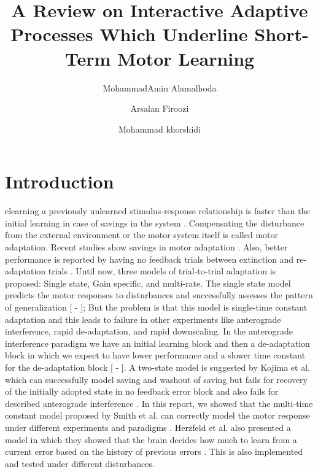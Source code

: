 \documentclass[9pt,twocolumn]{paper-template}
\title{A Review on Interactive Adaptive Processes Which Underline Short-Term Motor Learning}
\author[a]{MohammadAmin Alamalhoda}
\author[a]{Arsalan Firoozi}
\author[a]{Mohammad khorshidi}
\affil[a]{Student, EE Department, Sharif University of Technology}
\begin{document}
\maketitle
\thispagestyle{firststyle}

\section*{Introduction}
elearning a previously unlearned stimulus-response relationship is faster than the initial learning in case of savings in the system \cite{main_paper}. Compensating the disturbance from the external environment or the motor system itself is called motor adaptation. Recent studies show savings in motor adaptation \cite{Kojima}. Also, better performance is reported by having no feedback trials between extinction and re-adaptation trials \cite{Kojima}. 
Until now, three models of trial-to-trial adaptation is proposed: Single state, Gain specific, and multi-rate. The single state model predicts the motor responses to disturbances and successfully assesses the pattern of generalization [\cite{Scheidt} - \cite{Donchin}]; But the problem is that this model is single-time constant adaptation and this leads to failure in other experiments like anterograde interference, rapid de-adaptation, and rapid downscaling. In the anterograde interference paradigm we have an initial learning block and then a de-adaptation block in which we expect to have lower performance and a slower time constant for the de-adaptation block [\cite{Bizzi} - \cite{Wolpert}]. A two-state model is suggested by Kojima et al. which can successfully model saving and washout of saving but fails for recovery of the initially adopted state in no feedback error block and also fails for described anterograde interference \cite{Kojima}.
In this report, we showed that the multi-time constant model proposed by Smith et al. can correctly model the motor response under different experiments and paradigms \cite{main_paper}. Herzfeld et al. also presented a model in which they showed that the brain decides how much to learn from a current error based on the history of previous errors \cite{mem_error}. This is also implemented and tested under different disturbances.\\
\end{document}
